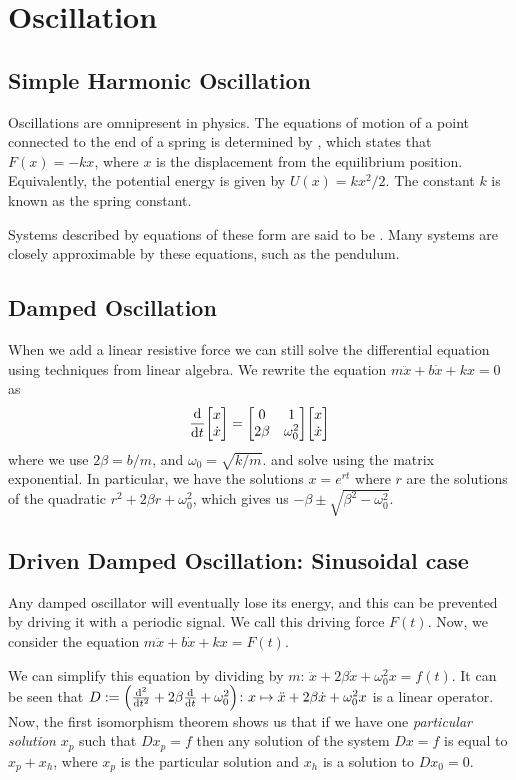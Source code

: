 \chapter{Oscillation}

\section{Simple Harmonic Oscillation}

Oscillations are omnipresent in physics. The equations of motion of a point connected to the end of a spring is determined by , which states that $F(x) = -kx$, where $x$ is the displacement from the equilibrium position. Equivalently, the potential energy is given by $U(x) = kx^2/2$. The constant $k$ is known as the spring constant. 

Systems described by equations of these form are said to be . Many systems are closely approximable by these equations, such as the pendulum. 

\section{Damped Oscillation}

When we add a linear resistive force we can still solve the differential equation using techniques from linear algebra. We rewrite the equation $m\ddot x + b\dot x + kx = 0$ as \[\dv{t}\mqty[x \\ \dot x] = \mqty[0 & 1 \\ 2\beta & \omega_0^2]\mqty[x \\ \dot x]\] where we use $2\beta = b/m$, and $\omega_0 = \sqrt{k/m}$. and solve using the matrix exponential. In particular, we have the solutions $x = e^{rt}$ where $r$ are the solutions of the quadratic $r^2 + 2\beta r + \omega_0^2$, which gives us $-\beta \pm \sqrt{\beta^2 - \omega_0^2}$.

\section{Driven Damped Oscillation: Sinusoidal case}

Any damped oscillator will eventually lose its energy, and this can be prevented by driving it with a periodic signal. We call this driving force $F(t)$. Now, we consider the equation $m\ddot x + b \dot x + kx = F(t)$. 

We can simplify this equation by dividing by $m$: $\ddot x + 2\beta \dot x + \omega_0^2 x = f(t)$. It can be seen that $D := \qty(\dv[2]{t} + 2\beta \dv{t} + \omega_0^2)\colon x \mapsto \ddot x + 2\beta \dot x + \omega_0^2x$ is a linear operator. Now, the first isomorphism theorem shows us that if we have one \emph{particular solution} $x_p$ such that $Dx_p = f$ then any solution of the system $Dx = f$ is equal to $x_p + x_h$, where $x_p$ is the particular solution and $x_h$ is a solution to $Dx_0 = 0$.


